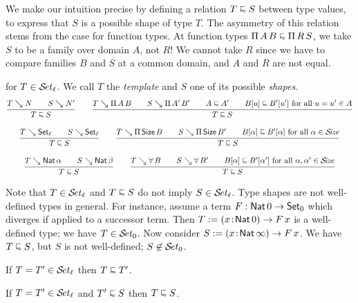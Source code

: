 \documentclass[acmlarge,review,anonymous]{acmart}\settopmatter{printfolios=true}
\begin{document}
We make our intuition precise by defining a relation $T \shape S$
between type values, to express that $S$ is a possible shape of type
$T$.  The asymmetry of this relation stems from the case for function
types.  At function types
$\piT A B \shape \piT R S$, we take $S$ to be a family over domain
$A$, not $R$!  We cannot take $R$ since we have to compare families $B$ and $S$
at a common domain, and $A$ and $R$ are not equal.

 for $T \in \SET[\ell]$.  We call $T$ the \emph{template} and $S$ one of its possible \emph{shapes}.
\begin{gather*}
  \ru{T \evalsto N \qquad
      S \evalsto N'
    }{T \shape S}
\qquad
  \ru{T \evalsto \piT A B \qquad
      S \evalsto \piT{A'}{B'} \qquad
      A \shape A' \qquad
      B[u] \shape B'[u'] \mforall u = u' \in A
    }{T \shape S}
\\[2ex]
   \ru{T \evalsto \Set[\ell] \qquad
       S \evalsto \Set[\ell]
    }{T \shape S}
\qquad
  \ru{T \evalsto \piT \Size B \qquad
      S \evalsto \piT{\Size}{B'} \qquad
      B[\alpha] \shape B'[\alpha] \mforall \alpha \in \SIZE
    }{T \shape S}
\\[2ex]
  \ru{T \evalsto \Nat \alpha \qquad
      S \evalsto \Nat \beta
    }{T \shape S}
\qquad
  \ru{T \evalsto \forallT B \qquad
      S \evalsto \forallT{B'} \qquad
      B[\alpha] \shape B'[\alpha'] \mforall \alpha,\alpha' \in \SIZE
    }{T \shape S}
\end{gather*}

Note that $T \in \SET[\ell]$ and $T \shape S$ do not imply $S \in \SET[\ell]$.
Type shapes are not well-defined types in general.
For instance, assume a term $F : \Nat 0 \to \Set[0]$ which diverges if applied to a successor term.
Then $T := \funT x {\Nat 0} {F\,x}$ is a well-defined type; we have $T \in \SET[0]$.
Now consider $S := \funT x {\Nat \infty} {F\,x}$.
We have $T \shape S$, but $S$ is not well-defined; $S \not\in \SET[0]$.

\begin{lemma}
  If\/ $T = T' \in \SET[\ell]$ then $T \shape T'$.
\end{lemma}

\begin{lemma}
  If\/ $T = T' \in \SET[\ell]$ and $T' \shape S$ then $T \shape S$.
\end{lemma}
\end{document}
